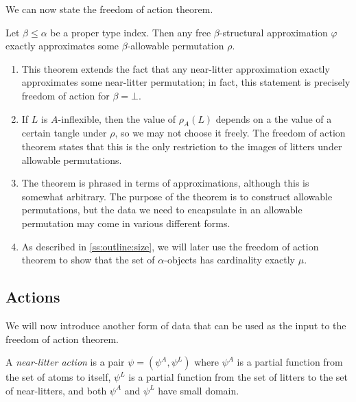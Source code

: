 We can now state the freedom of action theorem.

\begin{theorem}
    \label{thm:foa}
    Let \( \beta \leq \alpha \) be a proper type index.
    Then any free \( \beta \)-structural approximation \( \varphi \) exactly approximates some \( \beta \)-allowable permutation \( \rho \).
\end{theorem}

\begin{remarks}\mbox{\negthinspace}
    \begin{enumerate}
        \item This theorem extends the fact that any near-litter approximation exactly approximates some near-litter permutation; in fact, this statement is precisely freedom of action for \( \beta = \bot \).
        \item If \( L \) is \( A \)-inflexible, then the value of \( \rho_A(L) \) depends on a the value of a certain tangle under \( \rho \), so we may not choose it freely.
        The freedom of action theorem states that this is the only restriction to the images of litters under allowable permutations.
        \item The theorem is phrased in terms of approximations, although this is somewhat arbitrary.
        The purpose of the theorem is to construct allowable permutations, but the data we need to encapsulate in an allowable permutation may come in various different forms.
        \item As described in \cref{ss:outline:size}, we will later use the freedom of action theorem to show that the set of \( \alpha \)-objects has cardinality exactly \( \mu \).
    \end{enumerate}
\end{remarks}

\subsection{Actions}

We will now introduce another form of data that can be used as the input to the freedom of action theorem.

\begin{definition}
    A \emph{near-litter action} is a pair \( \psi = (\psi^A, \psi^L) \) where \( \psi^A \) is a partial function from the set of atoms to itself, \( \psi^L \) is a partial function from the set of litters to the set of near-litters, and both \( \psi^A \) and \( \psi^L \) have small domain.
\end{definition}

